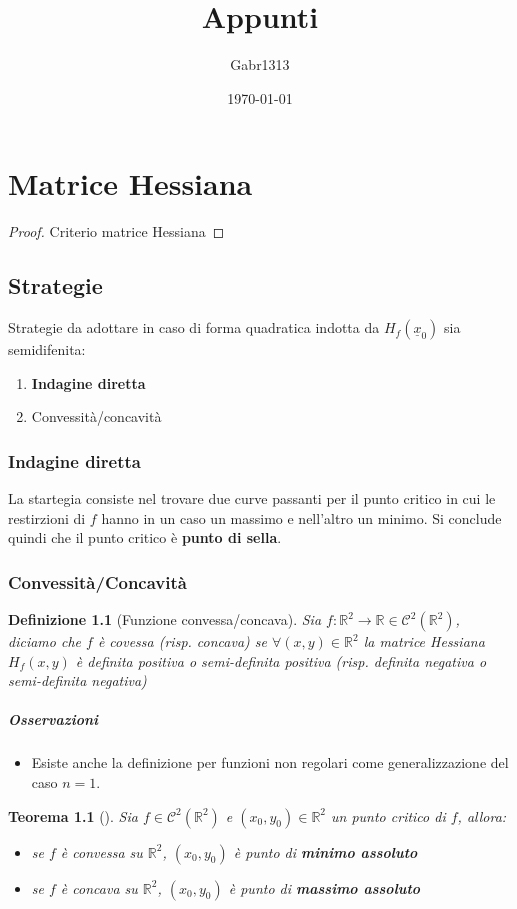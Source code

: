 \documentclass[12pt, a4paper]{report}
\title{Appunti}
\author{Gabr1313}
\date{\today}
\newtheorem{definition}{Definizione}
\newtheorem{theorem}{Teorema}
\begin{document}
\justify

\maketitle
\tableofcontents

\chapter{Matrice Hessiana}
\begin{proof}
	Criterio matrice Hessiana
\end{proof}

\section{Strategie}
Strategie da adottare in caso di forma quadratica indotta da
$H_f(\underline{x}_0)$ sia semidifenita:
\begin{enumerate}
	\item \textbf{Indagine diretta}
	\item Convessità/concavità
\end{enumerate}
\subsection{Indagine diretta}
La startegia consiste nel trovare due curve passanti per il punto critico in cui
le restirzioni di $f$ hanno in un caso un massimo e nell'altro un minimo. Si
conclude quindi che il punto critico è \textbf{punto di sella}.
\subsection{Convessità/Concavità}
\begin{definition}[Funzione convessa/concava]
	Sia $f : \mathbb{R}^2 \to \mathbb{R} \in \mathscr{C}^2(\mathbb{R}^2)$,
	diciamo che $f$ è covessa (risp. concava) se $\forall (x,y) \in
		\mathbb{R}^2$ la matrice Hessiana $H_f(x,y)$ è definita positiva o
	semi-definita positiva (risp. definita negativa o semi-definita negativa)
\end{definition}
\paragraph{Osservazioni}
\begin{itemize}
	\item Esiste anche la definizione per funzioni non regolari come
		generalizzazione del caso $n = 1$.
\end{itemize}
\begin{theorem}[]
	Sia $f \in \mathscr{C}^2(\mathbb{R}^2)$ e $(x_0, y_0) \in \mathbb{R}^2$
	un punto critico di $f$, allora:
	\begin{itemize}
		\item se $f$ è convessa su $\mathbb{R}^2$, $(x_0, y_0)$ è punto
			di \textbf{minimo assoluto}
		\item se $f$ è concava su $\mathbb{R}^2$, $(x_0, y_0)$ è punto
			di \textbf{massimo assoluto}
	\end{itemize}
\end{theorem}
\end{document}
